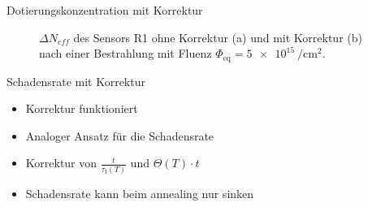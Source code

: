 \documentclass[aspectratio=1610, 9pt]{beamer}
\begin{document}
\begin{frame}{Dotierungskonzentration mit Korrektur}
  \begin{figure}
  \caption{$\Delta N_{eff}$ des Sensors R1 ohne Korrektur (a) und mit Korrektur (b) nach einer Bestrahlung mit Fluenz $\Phi_{\mathrm{eq}} = \SI{5e15}{\per\centi\meter\squared}.$}
  \end{figure}
\end{frame}

\begin{frame}{Schadensrate mit Korrektur}
  \begin{itemize}
    \item Korrektur funktioniert
    \medskip
    \item Analoger Ansatz für die Schadensrate
    \medskip
    \item Korrektur von $\frac{t}{\tau_{\mathrm{I}}(T)}$ und  $\Theta(T) \cdot t$
    \medskip
    \item Schadensrate kann beim annealing nur sinken
  \end{itemize}
\end{frame}
\end{document}
